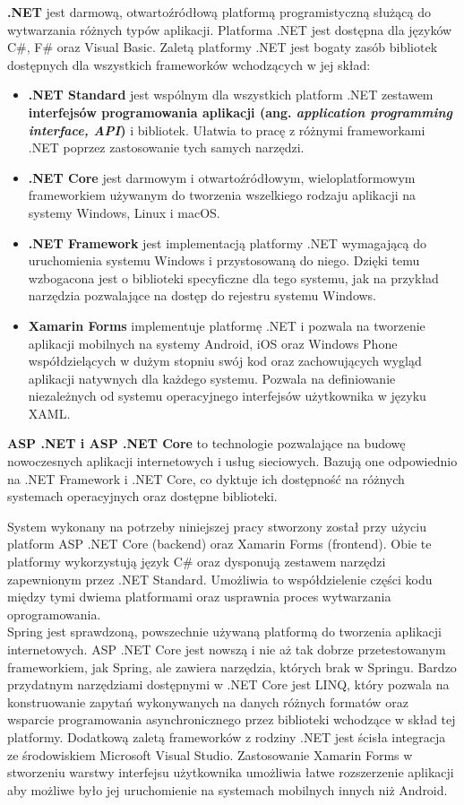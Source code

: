 \textbf{.NET} jest darmową, otwartoźródłową platformą programistyczną służącą do wytwarzania różnych typów aplikacji. Platforma .NET jest dostępna dla języków C\#, F\# oraz Visual Basic. Zaletą platformy .NET jest bogaty zasób bibliotek dostępnych dla wszystkich frameworków wchodzących w jej skład:
\begin{itemize}
	\item\textbf{.NET Standard} jest wspólnym dla wszystkich platform .NET zestawem \textbf{interfejsów programowania aplikacji (ang. \textit{application programming interface, API})} i bibliotek. Ułatwia to pracę z różnymi frameworkami .NET poprzez zastosowanie tych samych narzędzi.
	\item\textbf{.NET Core} jest darmowym i otwartoźródłowym, wieloplatformowym frameworkiem używanym do tworzenia wszelkiego rodzaju aplikacji na systemy Windows, Linux i macOS.
	\item\textbf{.NET Framework} jest implementacją platformy .NET wymagającą do uruchomienia systemu Windows i przystosowaną do niego. Dzięki temu wzbogacona jest o biblioteki specyficzne dla tego systemu, jak na przykład narzędzia pozwalające na dostęp do rejestru systemu Windows.
	\item\textbf{Xamarin Forms} implementuje platformę .NET i pozwala na tworzenie aplikacji mobilnych na systemy Android, iOS oraz Windows Phone współdzielących w dużym stopniu swój kod oraz zachowujących wygląd aplikacji natywnych dla każdego systemu.\cite{microsoftdotnet} Pozwala na definiowanie niezależnych od systemu operacyjnego interfejsów użytkownika w języku XAML.
\end{itemize}

\textbf{ASP .NET i ASP .NET Core} to technologie pozwalające na budowę nowoczesnych aplikacji internetowych i usług sieciowych. Bazują one odpowiednio na .NET Framework i .NET Core, co dyktuje ich dostępność na różnych systemach operacyjnych oraz dostępne biblioteki.

System wykonany na potrzeby niniejszej pracy stworzony został przy użyciu platform ASP .NET Core (backend) oraz Xamarin Forms (frontend). Obie te platformy wykorzystują język C\# oraz dysponują zestawem narzędzi zapewnionym przez .NET Standard. Umożliwia to współdzielenie części kodu między tymi dwiema platformami oraz usprawnia proces wytwarzania oprogramowania.\\
Spring jest sprawdzoną, powszechnie używaną platformą do tworzenia aplikacji internetowych. ASP .NET Core jest nowszą i nie aż tak dobrze przetestowanym frameworkiem, jak Spring, ale zawiera narzędzia, których brak w Springu. Bardzo przydatnym narzędziami dostępnymi w .NET Core jest LINQ, który pozwala na konstruowanie zapytań wykonywanych na danych różnych formatów oraz wsparcie programowania asynchronicznego przez biblioteki wchodzące w skład tej platformy. Dodatkową zaletą frameworków z rodziny .NET jest ścisła integracja ze środowiskiem Microsoft Visual Studio.
Zastosowanie Xamarin Forms w stworzeniu warstwy interfejsu użytkownika umożliwia łatwe rozszerzenie aplikacji aby możliwe było jej uruchomienie na systemach mobilnych innych niż Android.
